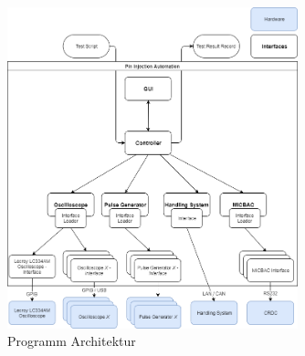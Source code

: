 \begin{figure}[H]
	\centering
	\includegraphics[width=0.75\textwidth, height=0.75\textwidth]{graphics/program_architecture.png}
	\caption{Programm Architektur}
	\label{fig:prg_architecture}
\end{figure}
	